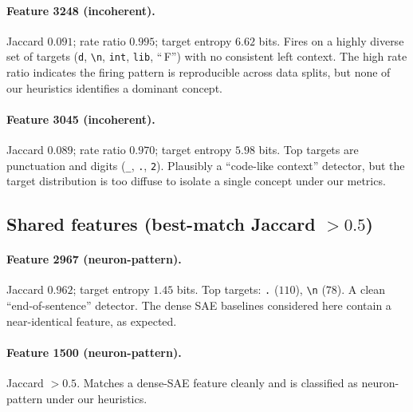 \documentclass{article}
\theoremstyle{plain}
\theoremstyle{definition}
\theoremstyle{remark}
\begin{document}
\paragraph{Feature 3248 (incoherent).}
Jaccard $0.091$; rate ratio $0.995$; target entropy $6.62$ bits.
%
Fires on a highly diverse set of targets (\texttt{d}, \texttt{\textbackslash n}, \texttt{int}, \texttt{lib}, ``\,F'') with no consistent left context.
%
The high rate ratio indicates the firing pattern is reproducible across data splits, but none of our heuristics identifies a dominant concept.

\paragraph{Feature 3045 (incoherent).}
Jaccard $0.089$; rate ratio $0.970$; target entropy $5.98$ bits.
%
Top targets are punctuation and digits (\texttt{\_}, \texttt{.}, \texttt{2}).
%
Plausibly a ``code-like context'' detector, but the target distribution is too diffuse to isolate a single concept under our metrics.

\subsection*{Shared features (best-match Jaccard $>0.5$)}

\paragraph{Feature 2967 (neuron-pattern).}
Jaccard $0.962$; target entropy $1.45$ bits.
%
Top targets: \texttt{.} ($110$), \texttt{\textbackslash n} ($78$).
%
A clean ``end-of-sentence'' detector.
%
The dense SAE baselines considered here contain a near-identical feature, as expected.

\paragraph{Feature 1500 (neuron-pattern).}
Jaccard $>0.5$.
%
Matches a dense-SAE feature cleanly and is classified as neuron-pattern under our heuristics.
\end{document}

